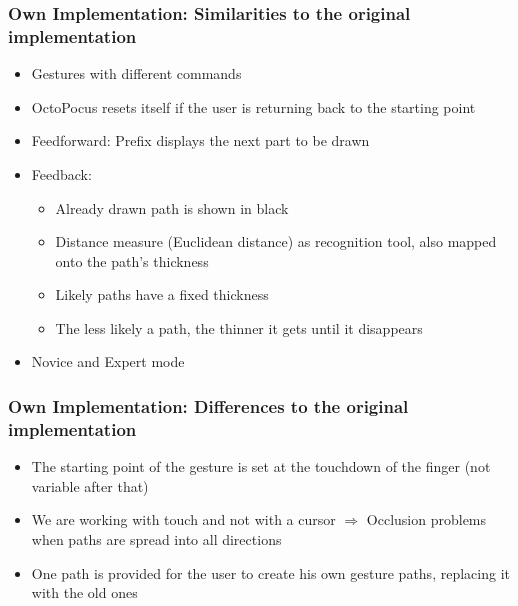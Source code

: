 \documentclass{beamer}
\begin{document}


\begin{frame}
\frametitle{Own Implementation: Similarities to the original implementation}

\begin{itemize}
\item Gestures with different commands
\pause
\item OctoPocus resets itself if the user is returning back to the starting point
\pause
\item Feedforward: Prefix displays the next part to be drawn
\pause
\item Feedback: 
	\begin{itemize}
	\pause
	\item Already drawn path is shown in black 
	\pause
	\item Distance measure (Euclidean distance) as recognition tool, also mapped onto the path's 				  thickness
	\pause
	\item Likely paths have a fixed thickness
	\pause
	\item The less likely a path, the thinner it gets until it disappears
	\pause
	\end{itemize}
\item Novice and Expert mode



\end{itemize}

\end{frame}


\begin{frame}
\frametitle{Own Implementation: Differences to the original implementation}

\begin{itemize}
\item The starting point of the gesture is set at the touchdown of the finger (not variable after that)
\pause
\item We are working with touch and not with a cursor \newline $\Rightarrow$ Occlusion problems when paths are spread into all directions
\pause
\item One path is provided for the user to create his own gesture paths, replacing it with the old ones 
\end{itemize}

\end{frame}
\end{document}
